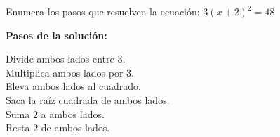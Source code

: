 Enumera los pasos que resuelven la ecuación: $3(x+2)^2=48$

\textbf{Pasos de la solución:}

\fillin[1][0.5cm] Divide ambos lados entre $3$.\\
\fillin[-][0.5cm] Multiplica ambos lados por $3$.\\
\fillin[-][0.5cm] Eleva ambos lados al cuadrado.\\
\fillin[2][0.5cm] Saca la raíz cuadrada de ambos lados.\\
\fillin[-][0.5cm] Suma $2$ a ambos lados.\\
\fillin[3][0.5cm] Resta $2$ de ambos lados.\\

